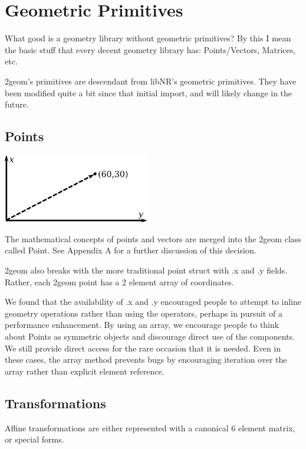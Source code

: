 \documentclass[openany]{book}
\newcommand{\code}[1]{\textsf{#1}}
\begin{document}
\chapter{Geometric Primitives}

What good is a geometry library without geometric primitives?  By this
I mean the basic stuff that every decent geometry library has:
Points/Vectors, Matrices, etc.

2geom's primitives are descendant from libNR's geometric primitives.
They have been modified quite a bit since that initial import, and
will likely change in the future.

\section{Points}

\includegraphics[height=30mm]{media/point.png}

The mathematical concepts of points and vectors are merged into the
2geom class called \code{Point}.  See Appendix A for a further
discussion of this decision.

2geom also breaks with the more traditional point \code{struct} with
\code{.x} and \code{.y} fields.  Rather, each 2geom point has a 2
element array of coordinates.

We found that the availability of \code{.x} and \code{.y} encouraged
people to attempt to inline geometry operations rather than using the
operators, perhaps in pursuit of a performance enhancement.  By using
an array, we encourage people to think about \code{Point}s as
symmetric objects and discourage direct use of the components.  We
still provide direct access for the rare occasion that it is needed.
Even in these cases, the array method prevents bugs by encouraging
iteration over the array rather than explicit element reference.

\section{Transformations}

Affine transformations are either represented with a canonical 6
element matrix, or special forms.
\end{document}
